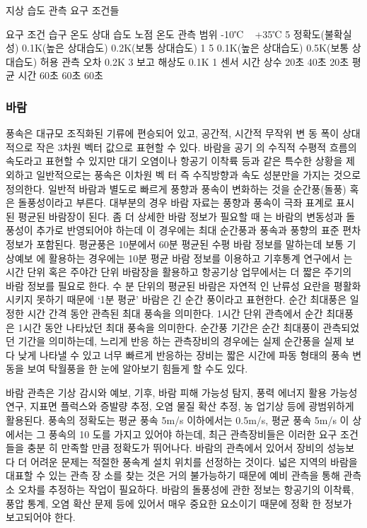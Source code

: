 지상 습도 관측 요구 조건들

요구 조건 습구 온도 상대 습도 노점 온도
관측 범위 -10℃ ~ +35℃ 5%
정확도(불확실성)
0.1K(높은 상대습도)
0.2K(보통 상대습도)
1%
5%
0.1K(높은 상대습도)
0.5K(보통 상대습도)
허용 관측 오차 0.2K 3%
보고 해상도 0.1K 1%
센서 시간 상수 20초 40초 20초
평균 시간 60초 60초 60초

\subsubsection{바람}

풍속은 대규모 조직화된 기류에 편승되어 있고, 공간적, 시간적 무작위 변
동 폭이 상대적으로 작은 3차원 벡터 값으로 표현할 수 있다. 바람을 공기
의 수직적 수평적 흐름의 속도라고 표현할 수 있지만 대기 오염이나 항공기
이착륙 등과 같은 특수한 상황을 제외하고 일반적으로는 풍속은 이차원 벡
터 즉 수직방향과 속도 성분만을 가지는 것으로 정의한다.
일반적 바람과 별도로 빠르게 풍향과 풍속이 변화하는 것을 순간풍(돌풍)
혹은 돌풍성이라고 부른다. 대부분의 경우 바람 자료는 풍향과 풍속이 극좌
표계로 표시된 평균된 바람장이 된다. 좀 더 상세한 바람 정보가 필요할 때
는 바람의 변동성과 돌풍성이 추가로 반영되어야 하는데 이 경우에는 최대
순간풍과 풍속과 풍향의 표준 편차 정보가 포함된다.
평균풍은 10분에서 60분 평균된 수평 바람 정보를 말하는데 보통 기상예보
에 활용하는 경우에는 10분 평균 바람 정보를 이용하고 기후통계 연구에서
는 시간 단위 혹은 주야간 단위 바람장을 활용하고 항공기상 업무에서는 더
짧은 주기의 바람 정보를 필요로 한다. 수 분 단위의 평균된 바람은 자연적
인 난류성 요란을 평활화 시키지 못하기 때문에 ‘1분 평균’ 바람은 긴 순간
풍이라고 표현한다.
순간 최대풍은 일정한 시간 간격 동안 관측된 최대 풍속을 의미한다. 1시간
단위 관측에서 순간 최대풍은 1시간 동안 나타났던 최대 풍속을 의미한다.
순간풍 기간은 순간 최대풍이 관측되었던 기간을 의미하는데, 느리게 반응
하는 관측장비의 경우에는 실제 순간풍을 실제 보다 낮게 나타낼 수 있고
너무 빠르게 반응하는 장비는 짧은 시간에 파동 형태의 풍속 변동을 보여
탁월풍을 한 눈에 알아보기 힘들게 할 수도 있다.

바람 관측은 기상 감시와 예보, 기후, 바람 피해 가능성 탐지, 풍력 에너지
활용 가능성 연구, 지표면 플럭스와 증발량 추정, 오염 물질 확산 추정, 농
업기상 등에 광범위하게 활용된다.
풍속의 정확도는 평균 풍속 5m/s 이하에서는 0.5m/s, 평균 풍속 5m/s 이
상에서는 그 풍속의 10%
도를 가지고 있어야 하는데, 최근 관측장비들은 이러한 요구 조건들을 충분
히 만족할 만큼 정확도가 뛰어나다.
바람의 관측에서 있어서 장비의 성능보다 더 어려운 문제는 적절한 풍속계
설치 위치를 선정하는 것이다. 넓은 지역의 바람을 대표할 수 있는 관측 장
소를 찾는 것은 거의 불가능하기 때문에 예비 관측을 통해 관측소 오차를
추정하는 작업이 필요하다. 바람의 돌풍성에 관한 정보는 항공기의 이착륙,
풍압 통계, 오염 확산 문제 등에 있어서 매우 중요한 요소이기 때문에 정확
한 정보가 보고되어야 한다.

